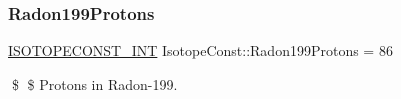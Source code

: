 \subsubsection{\texorpdfstring{Radon199\+Protons}{Radon199Protons}}
{\footnotesize\ttfamily \mbox{\hyperlink{group___isotope_const-_macros_ga5f18360b3e99483a35c32d789e62621c}{I\+S\+O\+T\+O\+P\+E\+C\+O\+N\+S\+T\+\_\+\+I\+NT}} Isotope\+Const\+::\+Radon199\+Protons = 86}

\$ \$ Protons in Radon-\/199. 